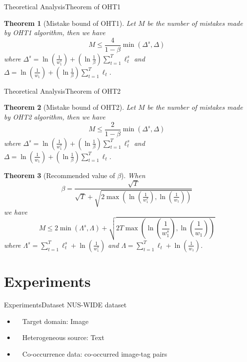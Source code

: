 \documentclass{beamer}
\newtheorem{thm}{Theorem}
\begin{document}
\begin{frame}{Theoretical Analysis}{Theorem of OHT1}
\begin{small}
\begin{thm}[Mistake bound of OHT1]
Let $M$ be the number of mistakes made by OHT1 algorithm, then we have 
$$ M \leq \frac{4}{1-\beta} \min (\varDelta^s, \varDelta) $$
where
$ \varDelta^s = \ln(\frac{1}{w_{1}^{s}}) + (\ln \frac{1}{\beta}) \sum\limits_{t=1}^{T} \ell_{t}^{s} $ and $ \varDelta = \ln(\frac{1}{w_{1}}) + (\ln \frac{1}{\beta}) \sum\limits_{t=1}^{T} \ell_{t} $.
\end{thm}
\end{small}
\end{frame}

\begin{frame}{Theoretical Analysis}{Theorem of OHT2}
\begin{footnotesize}
\begin{thm}[Mistake bound of OHT2]
Let $M$ be the number of mistakes made by OHT2 algorithm, then we have 
$$ M \leq \frac{2}{1-\beta} \min (\varDelta^s, \varDelta) $$
where
$ \varDelta^s = \ln(\frac{1}{w_{1}^{s}}) + (\ln \frac{1}{\beta}) \sum\limits_{t=1}^{T} \ell_{t}^{s} $ and $ \varDelta = \ln(\frac{1}{w_{1}}) + (\ln \frac{1}{\beta}) \sum\limits_{t=1}^{T} \ell_{t} $.
\end{thm}
\begin{thm}[Recommended value of $\beta$]
When 
$$ \beta = \frac{\sqrt{T}}{\sqrt{T} + \sqrt{2 \max (\ln(\frac{1}{w_{1}^{s}}), \ln(\frac{1}{w_1}))}} $$
we have 
$$ M \leq 2 \min (\varLambda^s, \varLambda) + \sqrt{2T \max (\ln(\frac{1}{w_{1}^{s}}), \ln(\frac{1}{w_1}))} $$
where $\varLambda^s = \sum\limits_{t=1}^{T}\ell_{t}^{s} + \ln(\frac{1}{w_{1}^{s}})$ and $\varLambda = \sum\limits_{t=1}^{T}\ell_{t} + \ln(\frac{1}{w_1})$.
\end{thm}
\end{footnotesize}
\end{frame}

\section{Experiments}
\begin{frame}{Experiments}{Dataset}
NUS-WIDE dataset \\
\begin{itemize}
\item
~~Target domain: Image 
\item
~~Heterogeneous source: Text
\item
~~Co-occurrence data: co-occurred image-tag pairs
\end{itemize}
\end{frame}
\end{document}
